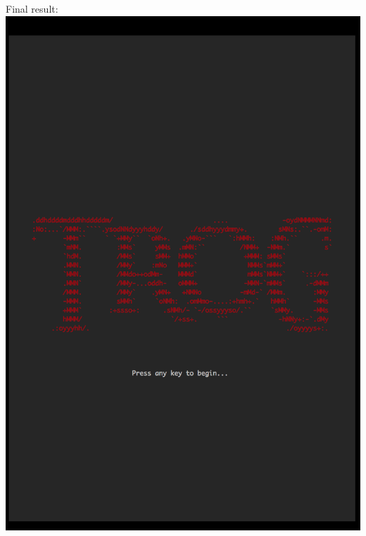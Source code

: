 \documentclass[a4paper,11pt]{article}
\begin{document}
Final result:\\
\includegraphics[width=17cm]{1.png}
\end{document}
